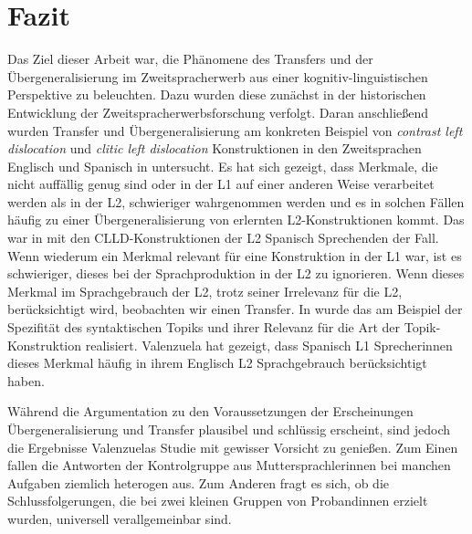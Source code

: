 \section{Fazit}

\begin{comment}
    * Einleitung und Fazit müssen zusammenpassen.
    * sind die Erkenntnisse im Fazit aus der Arbeit ableitbar?
    * Vorgehensweise zusammenfassen

Kritische Zusammenfassung
\begin{itemize}
    \item was war in den Texten nicht so gelungen?
    \item welche Fragen sind offen geblieben?
    \item in welche Richtung kann noch weiter geforscht werden?
    \item was sind gegnerische Meinungen zum Thema?
\end{itemize}
\end{comment}


Das Ziel dieser Arbeit war, die Phänomene des Transfers und der Übergeneralisierung im Zweitspracherwerb aus einer kognitiv-linguistischen Perspektive zu beleuchten.
Dazu wurden diese zunächst in der historischen Entwicklung der Zweitspracherwerbsforschung verfolgt.
Daran anschließend wurden Transfer und Übergeneralisierung am konkreten Beispiel von \textit{contrast left dislocation} und \textit{clitic left dislocation} Konstruktionen in den Zweitsprachen Englisch und Spanisch in \cite{Valenzuela05} untersucht.
Es hat sich gezeigt, dass Merkmale, die nicht auffällig genug sind oder in der L1 auf einer anderen Weise verarbeitet werden als in der L2, schwieriger wahrgenommen werden
und es in solchen Fällen häufig zu einer Übergeneralisierung von erlernten L2-Konstruktionen kommt.
Das war in \cite{Valenzuela05} mit den CLLD-Konstruktionen der L2 Spanisch Sprechenden der Fall.
Wenn wiederum ein Merkmal relevant für eine Konstruktion in der L1 war, ist es schwieriger, dieses bei der Sprachproduktion in der L2 zu ignorieren.
Wenn dieses Merkmal im Sprachgebrauch der L2, trotz seiner Irrelevanz für die L2, berücksichtigt wird, beobachten wir einen Transfer.
In \cite{Valenzuela05} wurde das am Beispiel der Spezifität des syntaktischen Topiks und ihrer Relevanz für die Art der Topik-Konstruktion realisiert.
Valenzuela hat gezeigt, dass Spanisch L1 Sprecherinnen dieses Merkmal häufig in ihrem Englisch L2 Sprachgebrauch berücksichtigt haben.

Während die Argumentation zu den Voraussetzungen der Erscheinungen Übergeneralisierung und Transfer plausibel und schlüssig erscheint, sind jedoch die Ergebnisse Valenzuelas Studie \cite{Valenzuela05} mit gewisser Vorsicht zu genießen.
Zum Einen fallen die Antworten der Kontrolgruppe aus Muttersprachlerinnen bei manchen Aufgaben ziemlich heterogen aus.
Zum Anderen fragt es sich, ob die Schlussfolgerungen, die bei zwei kleinen Gruppen von Probandinnen erzielt wurden, universell verallgemeinbar sind.

